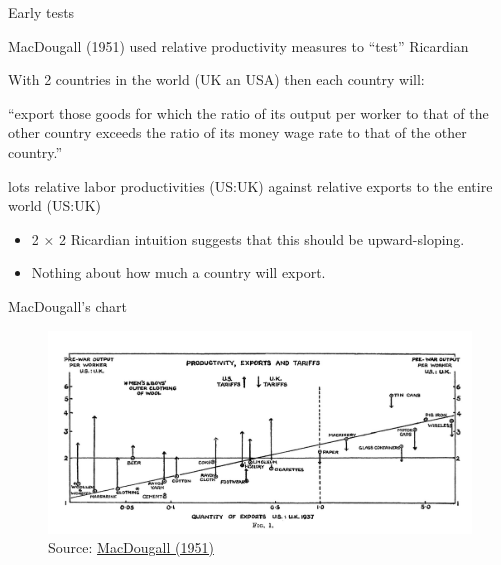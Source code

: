 \documentclass[notes,11pt, aspectratio=169, xcolor=table]{beamer}
\newenvironment{wideitemize}{\itemize\addtolength{\itemsep}{10pt}}{\enditemize}
\begin{document}
\begin{frame}{Early tests}
    \begin{wideitemize}
        \item MacDougall (1951) used relative productivity measures to ``test'' Ricardian

        \item With 2 countries in the world (UK an USA) then each country will:

        \begin{blockquote}
            “export those goods for which the ratio of its output per worker to that of the other country exceeds the ratio of its money wage rate to that of the other country.”
        \end{blockquote}

        \item lots relative labor productivities (US:UK) against relative exports to the entire world (US:UK)

        \begin{itemize}
            \item 2 × 2 Ricardian intuition suggests that this should be upward-sloping.
            \item Nothing about how much a country will export. 
        \end{itemize}
        
    \end{wideitemize}
\end{frame}

\begin{frame}{MacDougall's chart}
    \begin{figure}
        \centering
        \includegraphics[width=0.9\linewidth]{figs/MacDougall1.jpg}
        \caption{Source: \href{https://www.jstor.org/stable/pdf/2226976.pdf}{MacDougall (1951)} }
        \label{fig:macdouall}
    \end{figure}
\end{frame}
\end{document}

